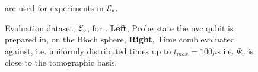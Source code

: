 \begin{figure}
    \begin{center}
        \qquad
    \end{center}
    \caption[Evaluation dataset for  ]{
        Evaluation dataset, ${ \mathcal{E} }_v$, for  . 
        \textbf{Left}, Probe state the \gls{nvc}  qubit is prepared in, on the Bloch sphere, 
        \textbf{Right}, Time comb evaluated against, i.e. uniformly distributed times up to $t_{max} = 100 \mu \textrm{s}$ 
        i.e. $\Psi_v$ is close to the tomographic basis. 
        }
        are used for experiments in ${ \mathcal{E} }_v$. 
    \label{fig:nv_ga_eval_data}
\end{figure}    

\par 

